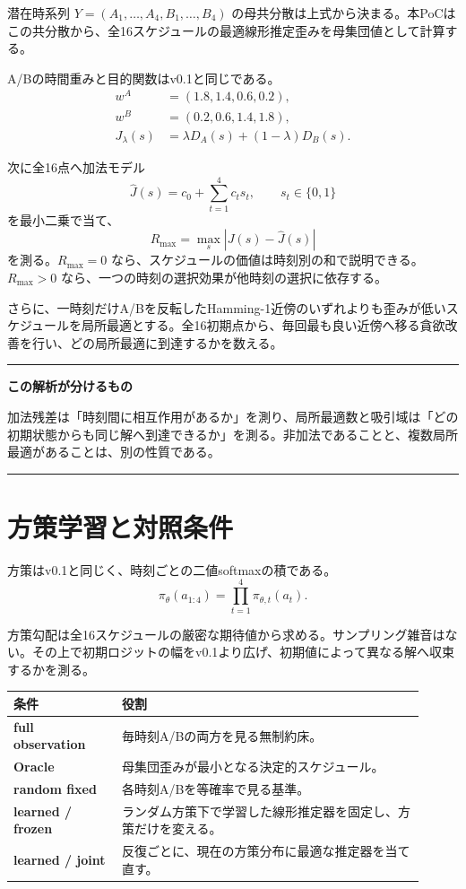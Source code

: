 \documentclass[11pt,a4paper]{ltjsarticle}
\newenvironment{warningbox}{\begin{center}\begin{minipage}{0.92\linewidth}\color{Accent}\hrule\vspace{6pt}\color{black}}{\vspace{6pt}\color{Accent}\hrule\color{black}\end{minipage}\end{center}}
\begin{document}
潜在時系列 $Y=(A_1,\dots,A_4,B_1,\dots,B_4)$ の母共分散は上式から決まる。本PoCはこの共分散から、全16スケジュールの最適線形推定歪みを母集団値として計算する。

A/Bの時間重みと目的関数はv0.1と同じである。
\begin{align}
w^A&=(1.8,1.4,0.6,0.2),\\
w^B&=(0.2,0.6,1.4,1.8),\\
J_\lambda(s)&=\lambda D_A(s)+(1-\lambda)D_B(s).
\end{align}

次に全16点へ加法モデル
\begin{equation}
\widehat J(s)=c_0+\sum_{t=1}^{4}c_t s_t,
\qquad s_t\in\{0,1\}
\end{equation}
を最小二乗で当て、
\begin{equation}
R_{\max}=\max_s|J(s)-\widehat J(s)|
\end{equation}
を測る。$R_{\max}=0$ なら、スケジュールの価値は時刻別の和で説明できる。$R_{\max}>0$ なら、一つの時刻の選択効果が他時刻の選択に依存する。

さらに、一時刻だけA/Bを反転したHamming-1近傍のいずれよりも歪みが低いスケジュールを局所最適とする。全16初期点から、毎回最も良い近傍へ移る貪欲改善を行い、どの局所最適に到達するかを数える。

\begin{warningbox}
\textbf{この解析が分けるもの}

加法残差は「時刻間に相互作用があるか」を測り、局所最適数と吸引域は「どの初期状態からも同じ解へ到達できるか」を測る。非加法であることと、複数局所最適があることは、別の性質である。
\end{warningbox}

\section{方策学習と対照条件}

方策はv0.1と同じく、時刻ごとの二値softmaxの積である。
\begin{equation}
\pi_\theta(a_{1:4})=\prod_{t=1}^{4}\pi_{\theta,t}(a_t).
\end{equation}

方策勾配は全16スケジュールの厳密な期待値から求める。サンプリング雑音はない。その上で初期ロジットの幅をv0.1より広げ、初期値によって異なる解へ収束するかを測る。

\begin{longtable}{>{\bfseries}p{0.24\linewidth}p{0.67\linewidth}}
\toprule
条件 & 役割 \\
\midrule
\endhead
full observation & 毎時刻A/Bの両方を見る無制約床。\\
Oracle & 母集団歪みが最小となる決定的スケジュール。\\
random fixed & 各時刻A/Bを等確率で見る基準。\\
learned / frozen & ランダム方策下で学習した線形推定器を固定し、方策だけを変える。\\
learned / joint & 反復ごとに、現在の方策分布に最適な推定器を当て直す。\\
\bottomrule
\end{longtable}
\end{document}
